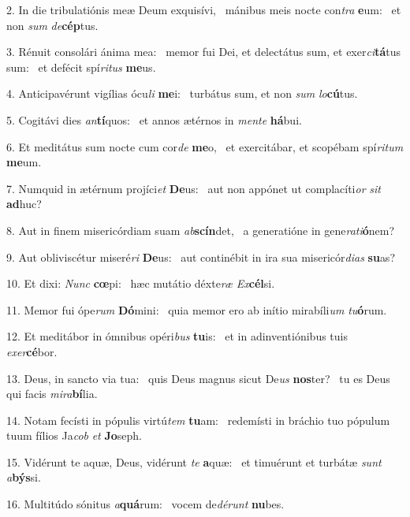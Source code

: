 2. In die tribulatiónis meæ Deum exquisívi, \dag\  mánibus meis nocte con\textit{tra} \textbf{e}um: \ast\  et non \textit{sum} \textit{de}\textbf{cép}tus.\

3. Rénuit consolári ánima mea: \dag\  memor fui Dei, et delectátus sum, et exer\textit{ci}\textbf{tá}tus sum: \ast\  et defécit spí\textit{ri}\textit{tus} \textbf{me}us.\

4. Anticipavérunt vigílias ócu\textit{li} \textbf{me}i: \ast\  turbátus sum, et non \textit{sum} \textit{lo}\textbf{cú}tus.\

5. Cogitávi dies \textit{an}\textbf{tí}quos: \ast\  et annos ætérnos in \textit{men}\textit{te} \textbf{há}bui.\

6. Et meditátus sum nocte cum cor\textit{de} \textbf{me}o, \ast\  et exercitábar, et scopébam spí\textit{ri}\textit{tum} \textbf{me}um.\

7. Numquid in ætérnum projíci\textit{et} \textbf{De}us: \ast\  aut non appónet ut complacíti\textit{or} \textit{sit} \textbf{ad}huc?\

8. Aut in finem misericórdiam suam \textit{ab}\textbf{scín}det, \ast\  a generatióne in gene\textit{ra}\textit{ti}\textbf{ó}nem?\

9. Aut obliviscétur miseré\textit{ri} \textbf{De}us: \ast\  aut continébit in ira sua misericór\textit{di}\textit{as} \textbf{su}as?\

10. Et dixi: \textit{Nunc} \textbf{cœ}pi: \ast\  hæc mutátio déxte\textit{ræ} \textit{Ex}\textbf{cél}si.\

11. Memor fui ópe\textit{rum} \textbf{Dó}mini: \ast\  quia memor ero ab inítio mirabíli\textit{um} \textit{tu}\textbf{ó}rum.\

12. Et meditábor in ómnibus opéri\textit{bus} \textbf{tu}is: \ast\  et in adinventiónibus tuis \textit{ex}\textit{er}\textbf{cé}bor.\

13. Deus, in sancto via tua: \dag\  quis Deus magnus sicut De\textit{us} \textbf{nos}ter? \ast\  tu es Deus qui facis \textit{mi}\textit{ra}\textbf{bí}lia.\

14. Notam fecísti in pópulis virtú\textit{tem} \textbf{tu}am: \ast\  redemísti in bráchio tuo pópulum tuum fílios Ja\textit{cob} \textit{et} \textbf{Jo}seph.\

15. Vidérunt te aquæ, Deus, vidérunt \textit{te} \textbf{a}quæ: \ast\  et timuérunt et turbátæ \textit{sunt} \textit{a}\textbf{býs}si.\

16. Multitúdo sónitus \textit{a}\textbf{quá}rum: \ast\  vocem de\textit{dé}\textit{runt} \textbf{nu}bes.\

